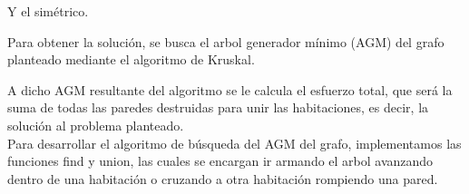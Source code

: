 Y el simétrico.

Para obtener la soluci\'on, se busca el arbol generador mínimo (AGM) del grafo planteado mediante el algoritmo de Kruskal. 

A dicho AGM resultante del algoritmo se le calcula el esfuerzo total, que será la suma de todas las paredes destruidas para unir las habitaciones, es decir, la solución al problema planteado.\\

Para desarrollar el algoritmo de b\'usqueda del AGM del grafo, implementamos las funciones find y union, las cuales se encargan ir armando el arbol avanzando dentro de una habitación o cruzando a otra habitación rompiendo una pared.
